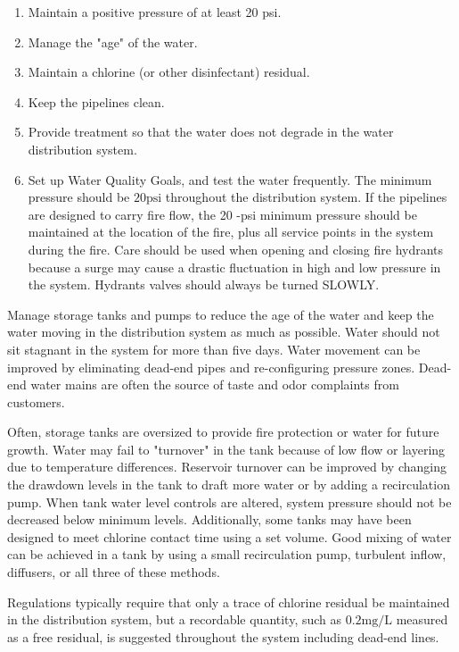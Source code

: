 \documentclass[10pt]{article}
\begin{document}
\begin{enumerate}
  \item Maintain a positive pressure of at least 20 psi.

  \item Manage the "age" of the water.

  \item Maintain a chlorine (or other disinfectant) residual.

  \item Keep the pipelines clean.

  \item Provide treatment so that the water does not degrade in the water distribution system.

  \item Set up Water Quality Goals, and test the water frequently. The minimum pressure should be $20 \mathrm{psi}$ throughout the distribution system. If the pipelines are designed to carry fire flow, the 20 -psi minimum pressure should be maintained at the location of the fire, plus all service points in the system during the fire. Care should be used when opening and closing fire hydrants because a surge may cause a drastic fluctuation in high and low pressure in the system. Hydrants valves should always be turned SLOWLY.

\end{enumerate}
Manage storage tanks and pumps to reduce the age of the water and keep the water moving in the distribution system as much as possible. Water should not sit stagnant in the system for more than five days. Water movement can be improved by eliminating dead-end pipes and re-configuring pressure zones. Dead-end water mains are often the source of taste and odor complaints from customers.

Often, storage tanks are oversized to provide fire protection or water for future growth. Water may fail to "turnover" in the tank because of low flow or layering due to temperature differences. Reservoir turnover can be improved by changing the drawdown levels in the tank to draft more water or by adding a recirculation pump. When tank water level controls are altered, system pressure should not be decreased below minimum levels. Additionally, some tanks may have been designed to meet chlorine contact time using a set volume. Good mixing of water can be achieved in a tank by using a small recirculation pump, turbulent inflow, diffusers, or all three of these methods.

Regulations typically require that only a trace of chlorine residual be maintained in the distribution system, but a recordable quantity, such as $0.2 \mathrm{mg} / \mathrm{L}$ measured as a free residual, is suggested throughout the system including dead-end lines.
\end{document}
